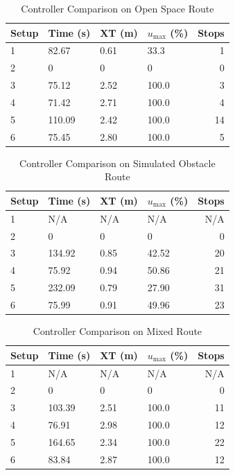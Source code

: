 \begin{table}[ht!]
\caption{Controller Comparison on Open Space Route}
\small
\centering
\begin{tabular}{@{}llllr@{}} \toprule
Setup & Time (s) & XT (m) & $u_{\text{max}}$ (\%) & Stops \\ \midrule
1     & 82.67    & 0.61   & 33.3                  & 1     \\
2     & 0        & 0      & 0                     & 0     \\
3     & 75.12    & 2.52   & 100.0                 & 3     \\
4     & 71.42    & 2.71   & 100.0                 & 4     \\
5     & 110.09   & 2.42   & 100.0                 & 14    \\
6     & 75.45    & 2.80   & 100.0                 & 5     \\ \bottomrule
\end{tabular}
\label{tab:resultsControllersOpenSpace}
\end{table}

\begin{table}[ht!]
\caption{Controller Comparison on Simulated Obstacle Route}
\small
\centering
\begin{tabular}{@{}llllr@{}} \toprule
Setup & Time (s) & XT (m) & $u_{\text{max}}$ (\%) & Stops \\ \midrule
1     & N/A      & N/A    & N/A                   & N/A   \\
2     & 0        & 0      & 0                     & 0     \\
3     & 134.92   & 0.85   & 42.52                 & 20    \\
4     & 75.92    & 0.94   & 50.86                 & 21    \\
5     & 232.09   & 0.79   & 27.90                 & 31    \\
6     & 75.99    & 0.91   & 49.96                 & 23    \\ \bottomrule
\end{tabular}
\label{tab:resultsControllersObstacles}
\end{table}

\begin{table}[ht!]
\caption{Controller Comparison on Mixed Route}
\small
\centering
\begin{tabular}{@{}llllr@{}} \toprule
Setup & Time (s) & XT (m) & $u_{\text{max}}$ (\%) & Stops \\ \midrule
1     & N/A      & N/A    & N/A                   & N/A   \\
2     & 0        & 0      & 0                     & 0     \\
3     & 103.39   & 2.51   & 100.0                 & 11    \\
4     & 76.91    & 2.98   & 100.0                 & 12    \\
5     & 164.65   & 2.34   & 100.0                 & 22    \\
6     & 83.84    & 2.87   & 100.0                 & 12    \\ \bottomrule
\end{tabular}
\label{tab:resultsControllersMixed}
\end{table}

